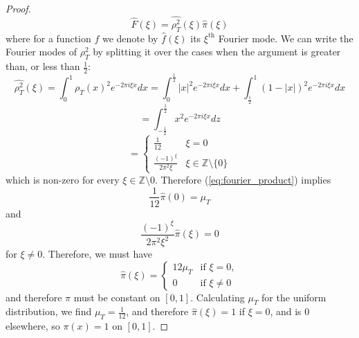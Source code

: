 \documentclass[10pt,a4paper]{amsart}
\begin{document}
\begin{proof}
    \begin{equation}
        \label{eq:fourier_product}
        \hat{F}(\xi) = \widehat{\rho_T^2}(\xi)\hat{\pi}(\xi)
    \end{equation}
    where for a function $f$ we denote by $\hat{f}(\xi)$ its $\xi^{\text{th}}$ Fourier mode. We can write the Fourier modes of $\rho_T^2$ by splitting it over the cases when the argument is greater than, or less than $\frac{1}{2}$:
    \begin{equation}
        \widehat{\rho_T^2}(\xi) = \int_0^1 \rho_T(x)^2e^{-2\pi i \xi x}dx = \int_0^{\frac{1}{2}} |x|^2e^{-2\pi i \xi x}dx + \int_{\frac{1}{2}}^1(1-|x|)^2e^{-2\pi i \xi  x}dx
    \end{equation}
    \begin{equation}
        = \int_{-\frac{1}{2}}^{\frac{1}{2}} x^2e^{-2 \pi i \xi x}dz
    \end{equation}
    \begin{equation}
        = \begin{cases}
            \frac{1}{12} & \xi = 0 \\
            \frac{(-1)^{\xi}}{2\pi^2\xi} & \xi \in \mathbb{Z}\setminus\{0\}
        \end{cases}
    \end{equation}
    which is non-zero for every $\xi  \in \mathbb{Z}\setminus{0}$. Therefore (\ref{eq:fourier_product}) implies
    \begin{equation}
        \frac{1}{12}\hat{\pi}(0) = \mu_T
    \end{equation}
    and
    \begin{equation}
        \frac{(-1)^{\xi }}{2\pi^2\xi ^2}  \hat{\pi}(\xi ) = 0
    \end{equation}
    for $\xi \neq 0$. Therefore, we must have
    \begin{equation}
        \hat{\pi}(\xi)  = \begin{cases}
            12\mu_T & \text{if }\xi =0, \\
            0 & \text{if }\xi \neq0
        \end{cases}
    \end{equation}
    and therefore $\pi$ must be constant on $[0,1]$. Calculating $\mu_T$ for the uniform distribution, we find $\mu_T = \frac{1}{12}$, and therefore $\hat{\pi}(\xi) = 1$ if $\xi = 0$, and is $0$ elsewhere, so $\pi(x) = 1$ on $[0,1]$.
\end{proof}
\end{document}

